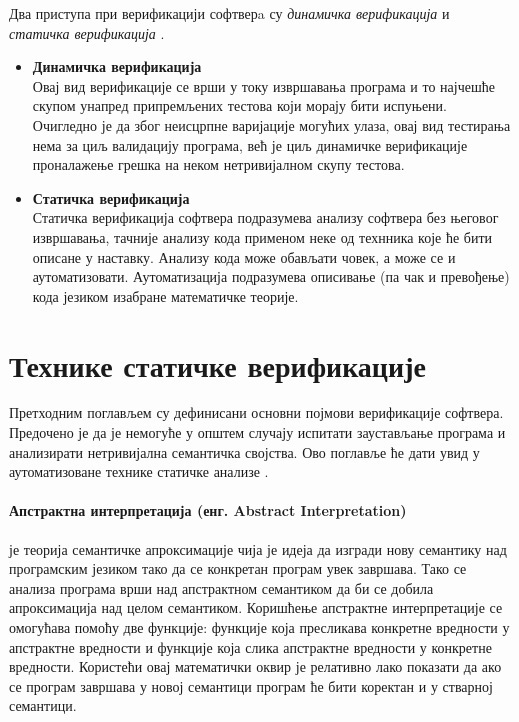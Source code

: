 \documentclass[a4paper]{article}
\begin{document}
{Два приступа при верификацији софтверa су \emph{динамичка верификација} и \emph{статичка верификација} \cite{milenaphd, milena}.
\begin{itemize}
\item \textbf{Динамичка верификација}\\
Овај вид верификације се врши у току извршавања програма и то најчешће скупом 
унапред припремљених тестова који морају бити испуњени. Очигледно је да због неисцрпне варијације могућих улаза, овај вид тестирања нема за циљ валидацију програма, већ је циљ динамичке верификације проналажење грешка на неком нетривијалном скупу тестова.
\item \textbf{Статичка верификација}\\
Статичка верификација софтвера подразумева анализу софтвера без његовог извршавања, тачније анализу кода применом неке од технника које ће бити описане у наставку. Анализу кода може обављати човек, а може се и аутоматизовати. Аутоматизација подразумева описивање (па чак и превођење) кода језиком изабране математичке теорије.
\end{itemize}


\section{Технике статичке верификације}
Претходним поглављем су дефинисани основни појмови верификације софтвера.
Предочено је да је немогуће у општем случају испитати заустављање програма и анализирати
нетривијална семантичка својства. Ово поглавље ће дати увид у аутоматизоване технике статичке анализе \cite{milenaphd}.

\paragraph{Апстрактна интерпретација (енг.  Abstract Interpretation)} је теорија семантичке апроксимације чија је идеја да изгради нову семантику над програмским језиком тако да се конкретан програм увек завршава\cite{survey}. Тако се анализа програма врши над апстрактном семантиком да би се добила апроксимација над целом семантиком. Коришћење апстрактне интерпретације се омогућава помоћу две функције: функције која пресликава конкретне вредности у апстрактне вредности и функције која слика апстрактне вредности у конкретне вредности.  Користећи овај математички оквир је релативно лако показати да ако се програм завршава у новој семантици програм ће бити коректан и у стварној семантици.

}
\end{document}
